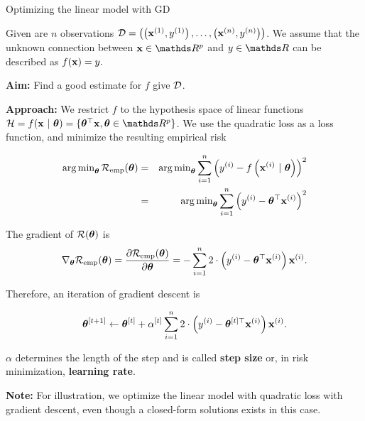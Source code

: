 \begin{vbframe}{Optimizing the linear model with GD}

	Given are $n$ observations $\mathcal{D} = \left( \left(\mathbf{x}^{(1)}, y^{(1)}\right), \ldots, \left(\mathbf{x}^{(n)}, y^{(n)}\right)\right)$. We assume that the unknown connection between $\xv \in \R^p$ and $y\in \R$ can be described as $f(\mathbf{x}) = y.$
	
	\vspace*{0.2cm}

	\textbf{Aim:} Find a good estimate for $f$ give $\mathcal{D}$. 

	\vspace*{0.2cm}

	\textbf{Approach:} We restrict $f$ to the hypothesis space of linear functions $\Hspace = \fxt = \{\thetab^{\top}\xv, \thetab \in \R^p\}$. We use the quadratic loss as a loss function, and minimize the resulting empirical risk
	
	\begin{eqnarray*}
	\operatorname{arg\,min}_{\bm{\theta}}\mathcal{R}_{\text{emp}}(\bm{\theta}) &=& \operatorname{arg\,min}_{\bm{\theta}} \sum_{i=1}^n \left(y^{(i)} - f\left(\mathbf{x}^{(i)} ~|~ \bm{\theta}\right)\right)^2 \\ &=& \operatorname{arg\,min}_{\bm{\theta}} \sum_{i=1}^n \left(y^{(i)} - \bm{\theta}^{\top} \mathbf{x}^{(i)}\right)^2 \\
	\end{eqnarray*}
	

	\framebreak
	
	The gradient of $\mathcal{R}(\bm{\theta})$ is 	
	$$
	\nabla_{\bm{\theta}}\mathcal{R}_{\text{emp}}(\bm{\theta}) =  \frac{\partial \mathcal{R}_{\text{emp}}(\bm{\theta})}{\partial
	\bm{\theta}} = - \sum_{i=1}^n 2 \cdot \left(y^{(i)} - \bm{\theta}^{\top} \mathbf{x}^{(i)}\right) \mathbf{x}^{(i)}.
	$$
	
	Therefore, an iteration of gradient descent is
	
	$$
	\bm{\theta}^{[t +1]} \leftarrow \bm{\theta}^{[t]} + \alpha^{[t]} \sum_{i=1}^n 2 \cdot \left(y^{(i)} - \bm{\theta}^{[t]\top} \mathbf{x}^{(i)}\right) \mathbf{x}^{(i)}.
	$$
	
	$\alpha$ determines the length of the step and is called \textbf{step size} or, in risk minimization, \textbf{learning rate}.

	\lz 

	\begin{footnotesize}
	\textbf{Note: } For illustration, we optimize the linear model with quadratic loss with gradient descent, even though a closed-form solutions exists in this case. 
	\end{footnotesize}


\end{vbframe}
